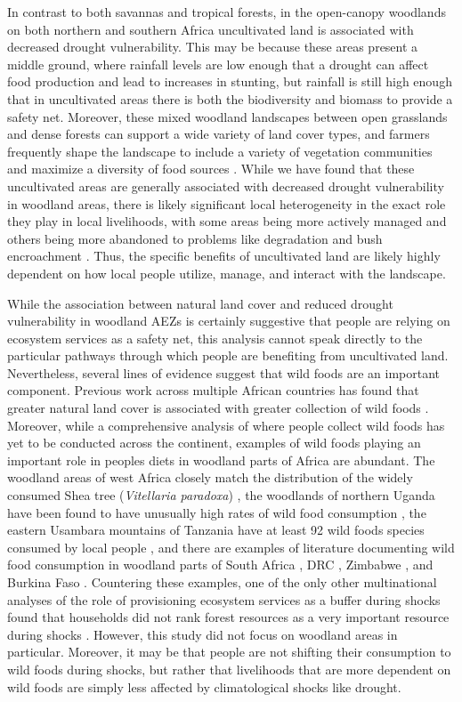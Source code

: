 \documentclass{article}
\begin{document}
In contrast to both savannas and tropical forests, in the open-canopy woodlands on both northern and southern Africa uncultivated land is associated with decreased drought vulnerability.  This may be because these areas present a middle ground, where rainfall levels are low enough that a drought can affect food production and lead to increases in stunting, but rainfall is still high enough that in uncultivated areas there is both the biodiversity and biomass to provide a safety net.  Moreover, these mixed woodland landscapes between open grasslands and dense forests can support a wide variety of land cover types, and farmers frequently shape the landscape to include a variety of vegetation communities and maximize a diversity of food sources \cite{fairhead1996misreading}.  While we have found that these uncultivated areas are generally associated with decreased drought vulnerability in woodland areas, there is likely significant local heterogeneity in the exact role they play in local livelihoods, with some areas being more actively managed and others being more abandoned to problems like degradation and bush encroachment \cite{o2014bush}.  Thus, the specific benefits of uncultivated land are likely highly dependent on how local people utilize, manage, and interact with the landscape.

While the association between natural land cover and reduced drought vulnerability in woodland AEZs is certainly suggestive that people are relying on ecosystem services as a safety net, this analysis cannot speak directly to the particular pathways through which people are benefiting from uncultivated land.  Nevertheless, several lines of evidence suggest that wild foods are an important component.  Previous work across multiple African countries has found that greater natural land cover is associated with greater collection of wild foods \cite{Cooper2018a}.  Moreover, while a comprehensive analysis of where people collect wild foods has yet to be conducted across the continent, examples of wild foods playing an important role in peoples diets in woodland parts of Africa are abundant.  The woodland areas of west Africa closely match the distribution of the widely consumed Shea tree (\textit{Vitellaria paradoxa}) \cite{Naughton2015, Naughton2017}, the woodlands of northern Uganda have been found to have unusually high rates of wild food consumption \cite{cooper2017vs}, the eastern Usambara mountains of Tanzania have at least 92 wild foods species consumed by local people \cite{powell2013wild}, and there are examples of literature documenting wild food consumption in woodland parts of South Africa \cite{garekae2020foraging}, DRC \cite{de2004value}, Zimbabwe \cite{zinyama1990use}, and Burkina Faso \cite{lamien2008importance}.  Countering these examples, one of the only other multinational analyses of the role of provisioning ecosystem services as a buffer during shocks found that households did not rank forest resources as a very important resource during shocks \cite{Wunder2014}. However, this study did not focus on woodland areas in particular.  Moreover, it may be that people are not shifting their consumption to wild foods during shocks, but rather that livelihoods that are more dependent on wild foods are simply less affected by climatological shocks like drought.
\end{document}
